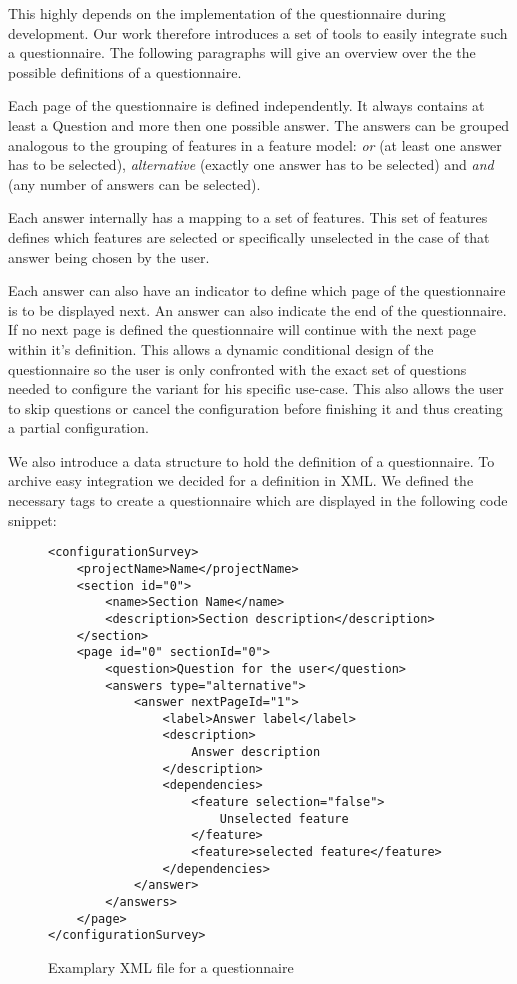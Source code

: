 This highly depends on the implementation of the questionnaire during development. Our work therefore introduces a set of tools to easily integrate such a questionnaire. The following paragraphs will give an overview over the the possible definitions of a questionnaire.

Each page of the questionnaire is defined independently. It always contains at least a Question and more then one possible answer. The answers can be grouped analogous to the grouping of features in a feature model: \textit{or} (at least one answer has to be selected), \textit{alternative} (exactly one answer has to be selected) and \textit{and} (any number of answers can be selected).

Each answer internally has a mapping to a set of features. This set of features defines which features are selected or specifically unselected in the case of that answer being chosen by the user.

Each answer can also have an indicator to define which page of the questionnaire is to be displayed next. An answer can also indicate the end of the questionnaire. If no next page is defined the questionnaire will continue with the next page within it's definition. This allows a dynamic conditional design of the questionnaire so the user is only confronted with the exact set of questions needed to configure the variant for his specific use-case. This also allows the user to skip questions or cancel the configuration before finishing it and thus creating a partial configuration.

We also introduce a data structure to hold the definition of a questionnaire. To archive easy integration we decided for a definition in XML. We defined the necessary tags to create a questionnaire which are displayed in the following code snippet:

\begin{figure}
\begin{lstlisting}
<configurationSurvey>
	<projectName>Name</projectName>
	<section id="0">
		<name>Section Name</name>
		<description>Section description</description>
	</section>
	<page id="0" sectionId="0">
		<question>Question for the user</question>
		<answers type="alternative">
			<answer nextPageId="1">
				<label>Answer label</label>
				<description>
					Answer description
				</description>
				<dependencies>
					<feature selection="false">
						Unselected feature
					</feature>
					<feature>selected feature</feature>
				</dependencies>
			</answer>
		</answers>
	</page>
</configurationSurvey>
\end{lstlisting}
\caption{Examplary XML file for a  questionnaire}
\end{figure}

